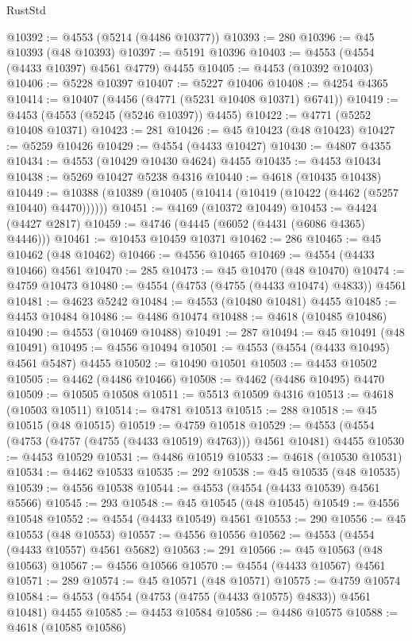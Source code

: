 \begin{lexlean}{RustStd}
\begin{coremodule}
@10392 := @4553 (@5214 (@4486 @10377))
@10393 := 280
@10396 := @45 @10393 (@48 @10393)
@10397 := @5191 @10396
@10403 := @4553 (@4554 (@4433 @10397) @4561 @4779) @4455
@10405 := @4453 (@10392 @10403)
@10406 := @5228 @10397
@10407 := @5227 @10406
@10408 := @4254 @4365
@10414 := @10407 (@4456 (@4771 (@5231 @10408 @10371) @6741))
@10419 := @4453 (@4553 (@5245 (@5246 @10397)) @4455)
@10422 := @4771 (@5252 @10408 @10371)
@10423 := 281
@10426 := @45 @10423 (@48 @10423)
@10427 := @5259 @10426
@10429 := @4554 (@4433 @10427)
@10430 := @4807 @4355
@10434 := @4553 (@10429 @10430 @4624) @4455
@10435 := @4453 @10434
@10438 := @5269 @10427 @5238 @4316
@10440 := @4618 (@10435 @10438)
@10449 := @10388 (@10389 (@10405 (@10414 (@10419 (@10422 (@4462 (@5257 @10440) @4470))))))
@10451 := @4169 (@10372 @10449)
@10453 := @4424 (@4427 @2817)
@10459 := @4746 (@4445 (@6052 (@4431 (@6086 @4365) @4446)))
@10461 := @10453 @10459 @10371
@10462 := 286
@10465 := @45 @10462 (@48 @10462)
@10466 := @4556 @10465
@10469 := @4554 (@4433 @10466) @4561
@10470 := 285
@10473 := @45 @10470 (@48 @10470)
@10474 := @4759 @10473
@10480 := @4554 (@4753 (@4755 (@4433 @10474) @4833)) @4561
@10481 := @4623 @5242
@10484 := @4553 (@10480 @10481) @4455
@10485 := @4453 @10484
@10486 := @4486 @10474
@10488 := @4618 (@10485 @10486)
@10490 := @4553 (@10469 @10488)
@10491 := 287
@10494 := @45 @10491 (@48 @10491)
@10495 := @4556 @10494
@10501 := @4553 (@4554 (@4433 @10495) @4561 @5487) @4455
@10502 := @10490 @10501
@10503 := @4453 @10502
@10505 := @4462 (@4486 @10466)
@10508 := @4462 (@4486 @10495) @4470
@10509 := @10505 @10508
@10511 := @5513 @10509 @4316
@10513 := @4618 (@10503 @10511)
@10514 := @4781 @10513
@10515 := 288
@10518 := @45 @10515 (@48 @10515)
@10519 := @4759 @10518
@10529 := @4553 (@4554 (@4753 (@4757 (@4755 (@4433 @10519) @4763))) @4561 @10481) @4455
@10530 := @4453 @10529
@10531 := @4486 @10519
@10533 := @4618 (@10530 @10531)
@10534 := @4462 @10533
@10535 := 292
@10538 := @45 @10535 (@48 @10535)
@10539 := @4556 @10538
@10544 := @4553 (@4554 (@4433 @10539) @4561 @5566)
@10545 := 293
@10548 := @45 @10545 (@48 @10545)
@10549 := @4556 @10548
@10552 := @4554 (@4433 @10549) @4561
@10553 := 290
@10556 := @45 @10553 (@48 @10553)
@10557 := @4556 @10556
@10562 := @4553 (@4554 (@4433 @10557) @4561 @5682)
@10563 := 291
@10566 := @45 @10563 (@48 @10563)
@10567 := @4556 @10566
@10570 := @4554 (@4433 @10567) @4561
@10571 := 289
@10574 := @45 @10571 (@48 @10571)
@10575 := @4759 @10574
@10584 := @4553 (@4554 (@4753 (@4755 (@4433 @10575) @4833)) @4561 @10481) @4455
@10585 := @4453 @10584
@10586 := @4486 @10575
@10588 := @4618 (@10585 @10586)

\end{coremodule}
\end{lexlean}
